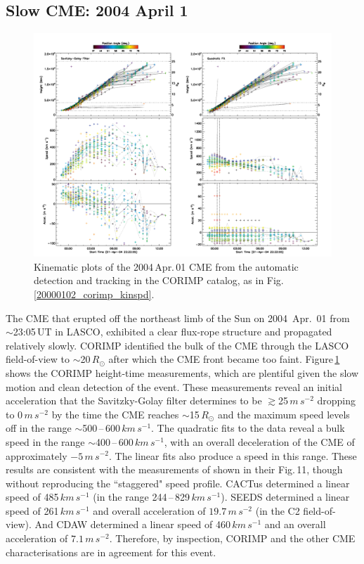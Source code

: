 \documentclass[referee,a4paper,12pt,traditabstract]{swsc}
\begin{document}
\begin{linenumbers}
\subsection{Slow CME: 2004 April 1}


\begin{figure}[t]
\centerline{\includegraphics[width=\linewidth]{images/20040401_corimp_kinspd.pdf}}
\caption{Kinematic plots of the 2004\,Apr.\,01 CME from the automatic detection and tracking in the CORIMP catalog, as in Fig.\,\ref{20000102_corimp_kinspd}.}
\label{20040401_corimp_kinspd}
\end{figure}

The CME that erupted off the northeast limb of the Sun on 2004~Apr.~01 from $\sim$23:05\,UT in LASCO, exhibited a clear flux-rope structure and propagated relatively slowly. CORIMP identified the bulk of the CME through the LASCO field-of-view to $\sim$20\,$R_\odot$ after which the CME front became too faint. Figure\,\ref{20040401_corimp_kinspd} shows the CORIMP height-time measurements, which are plentiful given the slow motion and clean detection of the event. These measurements reveal an initial acceleration that the Savitzky-Golay filter determines to be $\gtrsim$25\,$m\,s^{-2}$ dropping to 0\,$m\,s^{-2}$ by the time the CME reaches $\sim$15\,$R_\odot$ and the maximum speed levels off in the range $\sim$500\,--\,600\,$km\,s^{-1}$. The quadratic fits to the data reveal a bulk speed in the range $\sim$400\,--\,600\,$km\,s^{-1}$, with an overall deceleration of the CME of approximately $-5\,m\,s^{-2}$. The linear fits also produce a speed in this range. These results are consistent with the measurements of \cite{2009A&A...495..325B} shown in their Fig.\,11, though without reproducing the ``staggered" speed profile. CACTus determined a linear speed of 485$\,km\,s^{-1}$ (in the range 244\,--\,829\,$km\,s^{-1}$). SEEDS determined a linear speed of 261\,$km\,s^{-1}$ and overall acceleration of $19.7\,m\,s^{-2}$ (in the C2 field-of-view). And CDAW determined a linear speed of 460$\,km\,s^{-1}$ and an overall acceleration of $7.1\,m\,s^{-2}$. Therefore, by inspection, CORIMP and the other CME characterisations are in agreement for this event.



\end{linenumbers}
\end{document}
